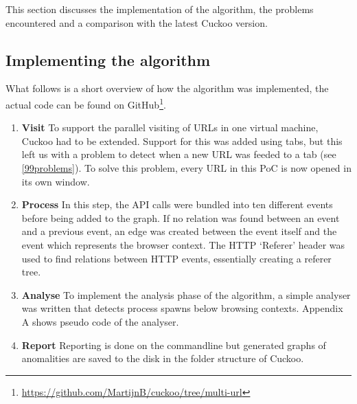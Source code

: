 This section discusses the implementation of the algorithm, the problems encountered and a comparison with the latest Cuckoo version.

\subsection{Implementing the algorithm}

What follows is a short overview of how the algorithm was implemented, the actual code can be found on GitHub\footnote{\url{https://github.com/MartijnB/cuckoo/tree/multi-url}}.

\begin{enumerate}
\item \textbf{Visit} To support the parallel visiting of URLs in one virtual machine, Cuckoo had to be extended. Support for this was added using tabs, but this left us with a problem to detect when a new URL was feeded to a tab (see \ref{99problems}). To solve this problem, every URL in this PoC is now opened in its own window.

\item \textbf{Process} In this step, the API calls were bundled into ten different events before being added to the graph. If no relation was found between an event and a previous event, an edge was created between the event itself and the event which represents the browser context. The HTTP `Referer' header was used to find relations between HTTP events, essentially creating a referer tree\cite{qui}. 

\item \textbf{Analyse} To implement the analysis phase of the algorithm, a simple analyser was written that detects process spawns below browsing contexts. Appendix A shows pseudo code of the analyser.


\item \textbf{Report} Reporting is done on the commandline but generated graphs of anomalities are saved to the disk in the folder structure of Cuckoo.
\end{enumerate}

